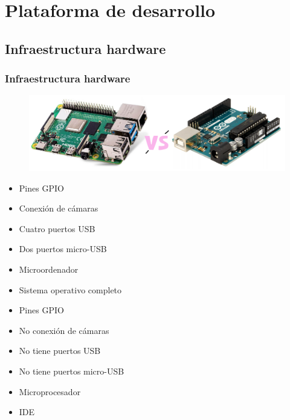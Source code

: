 \documentclass{beamer}
\begin{document}
\section{Plataforma de desarrollo}
\subsection{Infraestructura hardware}
\begin{frame}
\frametitle{Infraestructura hardware}
\begin{figure}
\centering
\includegraphics[width=12cm]{figs/VS}
\end{figure}
\begin{multicols}{2}

\begin{itemize}
\centering
\item[] Pines GPIO
\item[] Conexión de cámaras
\item[] Cuatro puertos USB
\item[] Dos puertos micro-USB
\item[] Microordenador
\item[] Sistema operativo completo
\item[] Pines GPIO
\item[] No conexión de cámaras
\item[] No tiene puertos USB
\item[] No tiene puertos micro-USB
\item[] Microprocesador
\item[] IDE
\end{itemize}

\end{multicols}
\end{frame}
\end{document}
